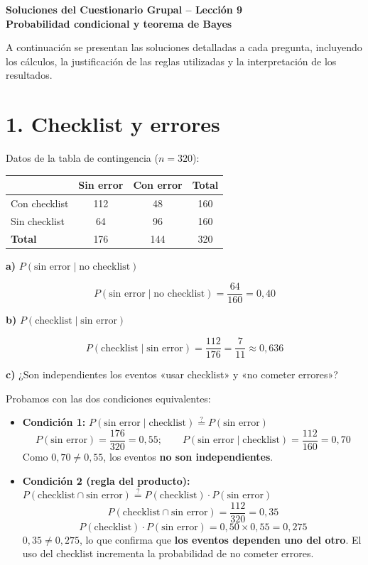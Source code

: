 \documentclass[11pt,letterpaper]{article}
\begin{document}
\begin{center}
    \textbf{\Large Soluciones del Cuestionario Grupal – Lección 9}\\[0.3cm]
    \textbf{Probabilidad condicional y teorema de Bayes}
\end{center}

A continuación se presentan las soluciones detalladas a cada pregunta, incluyendo los cálculos, la justificación de las reglas utilizadas y la interpretación de los resultados.

\section*{1. Checklist y errores}

Datos de la tabla de contingencia ($n = 320$):

\begin{center}
\begin{tabular}{lccc}
\toprule
                    & Sin error & Con error & Total \\
\midrule
Con checklist       & 112       & 48        & 160   \\
Sin checklist       & 64        & 96        & 160   \\
\midrule
\textbf{Total}      & 176       & 144       & 320   \\
\bottomrule
\end{tabular}
\end{center}

\textbf{a)} $P(\text{sin error} \mid \text{no checklist})$

\[
P(\text{sin error} \mid \text{no checklist}) = \frac{64}{160} = 0{,}40
\]

\textbf{b)} $P(\text{checklist} \mid \text{sin error})$

\[
P(\text{checklist} \mid \text{sin error}) = \frac{112}{176} = \frac{7}{11} \approx 0{,}636
\]

\textbf{c)} ¿Son independientes los eventos «usar checklist» y «no cometer errores»?

Probamos con las dos condiciones equivalentes:

\begin{itemize}
    \item \textbf{Condición 1:} $P(\text{sin error} \mid \text{checklist}) \stackrel{?}{=} P(\text{sin error})$
    \[
    P(\text{sin error}) = \frac{176}{320} = 0{,}55; \qquad
    P(\text{sin error} \mid \text{checklist}) = \frac{112}{160} = 0{,}70
    \]
    Como $0{,}70 \neq 0{,}55$, los eventos \textbf{no son independientes}.

    \item \textbf{Condición 2 (regla del producto):} $P(\text{checklist} \cap \text{sin error}) \stackrel{?}{=} P(\text{checklist}) \cdot P(\text{sin error})$
    \[
    P(\text{checklist} \cap \text{sin error}) = \frac{112}{320} = 0{,}35
    \]
    \[
    P(\text{checklist}) \cdot P(\text{sin error}) = 0{,}50 \times 0{,}55 = 0{,}275
    \]
    $0{,}35 \neq 0{,}275$, lo que confirma que \textbf{los eventos dependen uno del otro}. El uso del checklist incrementa la probabilidad de no cometer errores.
\end{itemize}
\end{document}
